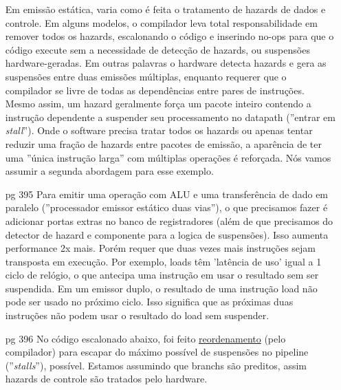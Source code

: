 \documentclass{article}
\begin{document}
\begin{enumerate}
Em emissão estática, varia como é feita o tratamento de hazards de dados e
controle. Em alguns modelos, o compilador leva total responsabilidade em remover
todos os hazards, escalonando o código e inserindo no-ops para que o código
execute sem a necessidade de detecção de hazards, ou suspensões
hardware-geradas. Em outras palavras o hardware detecta hazards e gera as
suspensões entre duas emissões múltiplas, enquanto requerer que o compilador se
livre de todas as dependências entre pares de instruções. Mesmo assim, um hazard
geralmente força um pacote inteiro contendo a instrução dependente a suspender
seu processamento no datapath (''entrar em \textit{stall}''). Onde o software
precisa tratar todos os hazards ou apenas tentar reduzir uma fração de hazards
entre pacotes de emissão, a aparência de ter uma ''única instrução larga'' com
múltiplas operações é reforçada. Nós vamos assumir a segunda abordagem para esse
exemplo.

\clearpage
\item[pg 395] Para emitir uma operação com ALU e uma transferência de dado em
paralelo (''processador emissor estático duas vias''), o que precisamos fazer é
adicionar portas extras no banco de registradores (além de que precisamos do
detector de hazard e componente para a logica de suspensões). Isso aumenta
performance 2x mais. Porém requer que duas vezes mais instruções sejam
transposta em execução. Por exemplo, loads têm 'latência de uso' igual a 1 ciclo
de relógio, o que antecipa uma instrução em usar o resultado sem ser suspendida.
Em um emissor duplo, o resultado de uma instrução load não pode ser usado no
próximo ciclo. Isso significa que as próximas duas instruções não podem usar o
resultado do load sem suspender.

\item[pg 396] No código escalonado abaixo, foi feito \underline{reordenamento}
(pelo compilador) para escapar do máximo possível de suspensões no pipeline
(''\textit{stalls}''), possível. Estamos assumindo que branchs são preditos,
assim hazards de controle são tratados pelo hardware.


\end{enumerate}
\end{document}
